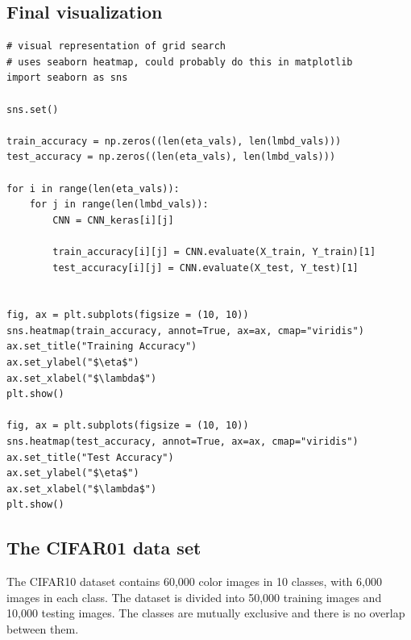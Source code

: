 \documentclass[%
oneside,                 %
final,                   %
10pt]{article}
\begin{document}
\subsection{Final visualization}
































\begin{verbatim}
# visual representation of grid search
# uses seaborn heatmap, could probably do this in matplotlib
import seaborn as sns

sns.set()

train_accuracy = np.zeros((len(eta_vals), len(lmbd_vals)))
test_accuracy = np.zeros((len(eta_vals), len(lmbd_vals)))

for i in range(len(eta_vals)):
    for j in range(len(lmbd_vals)):
        CNN = CNN_keras[i][j]

        train_accuracy[i][j] = CNN.evaluate(X_train, Y_train)[1]
        test_accuracy[i][j] = CNN.evaluate(X_test, Y_test)[1]

        
fig, ax = plt.subplots(figsize = (10, 10))
sns.heatmap(train_accuracy, annot=True, ax=ax, cmap="viridis")
ax.set_title("Training Accuracy")
ax.set_ylabel("$\eta$")
ax.set_xlabel("$\lambda$")
plt.show()

fig, ax = plt.subplots(figsize = (10, 10))
sns.heatmap(test_accuracy, annot=True, ax=ax, cmap="viridis")
ax.set_title("Test Accuracy")
ax.set_ylabel("$\eta$")
ax.set_xlabel("$\lambda$")
plt.show()

\end{verbatim}


\subsection{The CIFAR01 data set}

The CIFAR10 dataset contains 60,000 color images in 10 classes, with
6,000 images in each class. The dataset is divided into 50,000
training images and 10,000 testing images. The classes are mutually
exclusive and there is no overlap between them.
\end{document}
